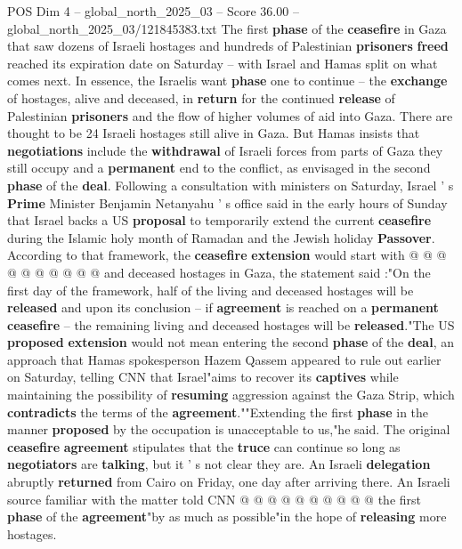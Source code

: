 \begin{textsample}{POS Dim 4 – global\_north\_2025\_03 – Score 36.00 – global\_north\_2025\_03/121845383.txt}  \label{ex:f4_pos_061}
The first \textbf{phase} of the \textbf{ceasefire} in Gaza that saw dozens of Israeli hostages and hundreds of Palestinian \textbf{prisoners} \textbf{freed} reached its expiration date on Saturday -- with Israel and Hamas split on what comes next.
In essence, the Israelis want \textbf{phase} one to continue -- the \textbf{exchange} of hostages, alive and deceased, in \textbf{return} for the continued \textbf{release} of Palestinian \textbf{prisoners} and the flow of higher volumes of aid into Gaza.
There are thought to be 24 Israeli hostages still alive in Gaza.
But Hamas insists that \textbf{negotiations} include the \textbf{withdrawal} of Israeli forces from parts of Gaza they still occupy and a \textbf{permanent} end to the conflict, as envisaged in the second \textbf{phase} of the \textbf{deal}.
Following a consultation with ministers on Saturday, Israel ' s \textbf{Prime} Minister Benjamin Netanyahu ' s office said in the early hours of Sunday that Israel backs a US \textbf{proposal} to temporarily extend the current \textbf{ceasefire} during the Islamic holy month of Ramadan and the Jewish holiday \textbf{Passover}.
According to that framework, the \textbf{ceasefire} \textbf{extension} would start with @ @ @ @ @ @ @ @ @ @ and deceased hostages in Gaza, the statement said :"On the first day of the framework, half of the living and deceased hostages will be \textbf{released} and upon its conclusion -- if \textbf{agreement} is reached on a \textbf{permanent} \textbf{ceasefire} -- the remaining living and deceased hostages will be \textbf{released}."The US \textbf{proposed} \textbf{extension} would not mean entering the second \textbf{phase} of the \textbf{deal}, an approach that Hamas spokesperson Hazem Qassem appeared to rule out earlier on Saturday, telling CNN that Israel"aims to recover its \textbf{captives} while maintaining the possibility of \textbf{resuming} aggression against the Gaza Strip, which \textbf{contradicts} the terms of the \textbf{agreement}.""Extending the first \textbf{phase} in the manner \textbf{proposed} by the occupation is unacceptable to us,"he said.
The original \textbf{ceasefire} \textbf{agreement} stipulates that the \textbf{truce} can continue so long as \textbf{negotiators} are \textbf{talking}, but it ' s not clear they are.
An Israeli \textbf{delegation} abruptly \textbf{returned} from Cairo on Friday, one day after arriving there.
An Israeli source familiar with the matter told CNN @ @ @ @ @ @ @ @ @ @ the first \textbf{phase} of the \textbf{agreement}"by as much as possible"in the hope of \textbf{releasing} more hostages.

\end{textsample}
